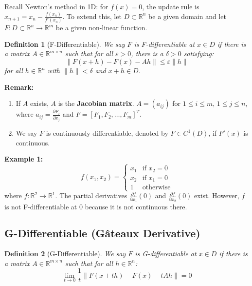 \documentclass[12pt, a4paper]{article}
\theoremstyle{break}
\newtheorem{definition}{Definition}[section]
\begin{document}
Recall Newton's method in 1D: for $f(x) = 0$, the update rule is $x_{n+1} = x_n - \frac{f(x_n)}{f'(x_n)}$.
To extend this, let $D \subset \mathbb{R}^n$ be a given domain and let $F: D \subset \mathbb{R}^n \to \mathbb{R}^m$ be a given non-linear function.
\begin{definition}[F-Differentiable]
We say $F$ is F-differentiable at $x \in D$ if there is a matrix $A \in \mathbb{R}^{m \times n}$ such that for all $\varepsilon > 0$, there is a $\delta > 0$ satisfying:
\begin{equation*}
    \|F(x+h) - F(x) - Ah\| \le \varepsilon \|h\|
\end{equation*}
for all $h \in \mathbb{R}^n$ with $\|h\| < \delta$ and $x+h \in D$.
\end{definition}

\noindent \textbf{Remark:}
\begin{enumerate}
    \item If $A$ exists, $A$ is the \textbf{Jacobian matrix}.
$A = (a_{ij})$ for $1 \le i \le m$, $1 \le j \le n$, where $a_{ij} = \frac{\partial F_i}{\partial x_j}$ and $F = [F_1, F_2, \dots, F_m]^T$.
    \item We say $F$ is continuously differentiable, denoted by $F \in C^1(D)$, if $F'(x)$ is continuous.
\end{enumerate}

\textbf{Example 1:} 
\begin{equation*}
    f(x_1, x_2) = 
    \begin{cases} 
    x_1 & \text{if } x_2 = 0 \\ 
    x_2 & \text{if } x_1 = 0 \\ 
    1 & \text{otherwise} 
    \end{cases}
\end{equation*}
where $f: \mathbb{R}^2 \to \mathbb{R}^1$.
The partial derivatives $\frac{\partial f}{\partial x_1}(0)$ and $\frac{\partial f}{\partial x_2}(0)$ exist.
However, $f$ is not F-differentiable at $0$ because it is not continuous there.
\subsection{G-Differentiable (Gâteaux Derivative)}

\begin{definition}[G-Differentiable]
We say $F$ is G-differentiable at $x \in D$ if there is a matrix $A \in \mathbb{R}^{m \times n}$ such that for all $h \in \mathbb{R}^n$:
\begin{equation*}
    \lim_{t \to 0} \frac{1}{t} \|F(x+th) - F(x) - tAh\| = 0
\end{equation*}
\end{definition}
\end{document}
